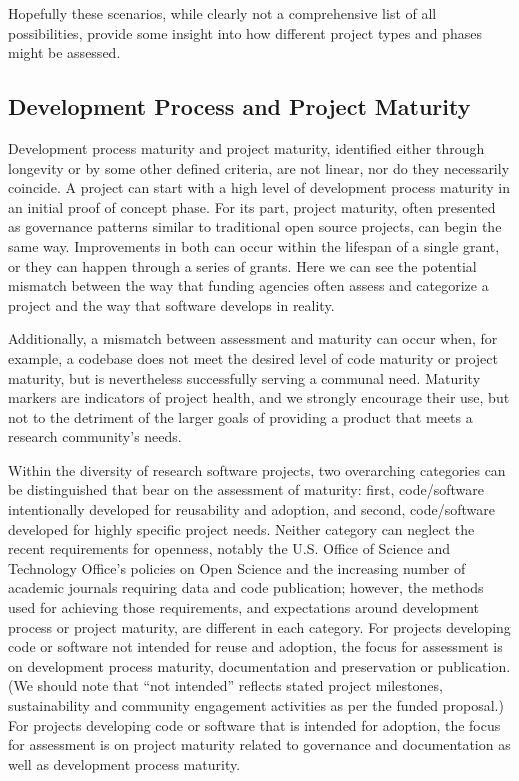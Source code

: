 \documentclass{article}
\begin{document}
Hopefully these scenarios, while clearly not a comprehensive list of all possibilities, provide some insight into how different project types and phases might be assessed. 

\subsection{Development Process and Project Maturity}
Development process maturity and project maturity, identified either through longevity or by some other defined criteria, are not linear, nor do they necessarily coincide. A project can start with a high level of development process maturity in an initial proof of concept phase. For its part, project maturity, often presented as governance patterns similar to traditional open source projects, can begin the same way. Improvements in both can occur within the lifespan of a single grant, or they can happen through a series of grants. Here we can see the potential mismatch between the way that funding agencies often assess and categorize a project and the way that software develops in reality. 
 
Additionally, a mismatch between assessment and maturity can occur when, for example, a codebase does not meet the desired level of code maturity or project maturity, but is nevertheless successfully serving a communal need. Maturity markers are indicators of project health, and we strongly encourage their use, but not to the detriment of the larger goals of providing a product that meets a research community’s needs.
 
Within the diversity of research software projects, two overarching categories can be distinguished that bear on the assessment of maturity: first, code/software intentionally developed for reusability and adoption, and second, code/software developed for highly specific project needs. Neither category can neglect the recent requirements for openness, notably the U.S. Office of Science and Technology Office’s policies on Open Science \autocite{holdren_increasing_2013} and the increasing number of academic journals requiring data and code publication; however, the methods used for achieving those requirements, and expectations around development process or project maturity, are different in each category. For projects developing code or software not intended for reuse and adoption, the focus for assessment is on development process maturity, documentation and preservation or publication. (We should note that “not intended” reflects stated project milestones, sustainability and community engagement activities as per the funded proposal.) For projects developing code or software that is intended for adoption, the focus for assessment is on project maturity related to governance and documentation as well as development process maturity.
 
\end{document}
